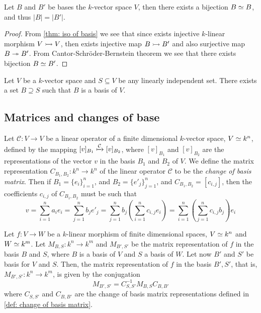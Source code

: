 \begin{lemma}
  Let \(B\) and \(B'\) be bases the \(k\)-vector space \(V\), then there exists
  a bijection \(B \simeq B\), and thus \(|B| = |B'|\).
\end{lemma}

\begin{proof}
  From \cref{thm: iso of basis} we see that since exists injective
  \(k\)-linear morphism \(V \rightarrowtail V\), then exists injective map \(B
  \rightarrowtail B'\) and also surjective map \(B \twoheadrightarrow B'\). From
  Cantor-Schröder-Bernstein theorem we see that there exists bijection \(B \simeq
  B'\).
\end{proof}

\begin{proposition}\label{prop: li to basis}
  Let \(V\) be a \(k\)-vector space and \(S \subseteq V\) be any linearly
  independent set. There exists a set \(B \supseteq S\) such that \(B\) is a
  basis of \(V\).
\end{proposition}


\subsection{Matrices and changes of base}

\begin{definition}
  \label{def: change of basis matrix}
  Let \(\mathcal C : V \to V\) be a linear operator of a finite dimensional
  \(k\)-vector space, \(V \simeq k^n\), defined by the mapping \([v]_{B_1}
  \xmapsto{\mathcal C} [v]_{B_2}\), where \([v]_{B_1}\) and \([v]_{B_2}\) are the
  representations of the vector \(v\) in the basis \(B_1\) and \(B_2\) of \(V\).
  We define the matrix representation \(C_{B_1, B_2} : k^n \to k^n\) of the
  linear operator \(\mathcal C\) to be the \emph{change of basis matrix}. Then
  if \(B_1 = \{e_i\}_{i=1}^n\), and \(B_2 = \{e'_j\}_{j=1}^n\), and \(C_{B_1,
  B_2} = [c_{i, j}]\), then the coefficients \(c_{i, j}\) of \(C_{B_1, B_2}\)
  must be such that
  \[
    v = \sum_{i=1}^n a_i e_i = \sum_{j=1}^n b_j e'_j
    = \sum_{j=1}^n b_j \left( \sum_{i=1}^n c_{i, j} e_i \right)
    = \sum_{i=1}^n \left( \sum_{j=1}^n c_{i, j} b_j \right) e_i
  \]
\end{definition}

\begin{proposition}
  \label{prop: change of basis, linear morphism}
  Let \(f : V \to W\) be a \(k\)-linear morphism of finite dimensional spaces,
  \(V \simeq k^n\) and \(W \simeq k^m\). Let \(M_{B, S} : k^n \to k^m\) and \(M_{B',
  S'}\) be the matrix representation of \(f\) in the basis \(B\) and \(S\),
  where \(B\) is a basis of \(V\) and \(S\) a basis of \(W\). Let now \(B'\) and
  \(S'\) be basis for \(V\) and \(S\). Then, the matrix representation of \(f\)
  in the basis \(B', S'\), that is, \(M_{B', S'} : k^n \to k^m\), is given by
  the conjugation
  \[
    M_{B', S'} = C_{S, S'}^{-1} M_{B, S} C_{B, B'}
  \]
  where \(C_{S, S'}\) and \(C_{B, B'}\) are the change of basis matrix
  representations defined in \cref{def: change of basis matrix}.
\end{proposition}

